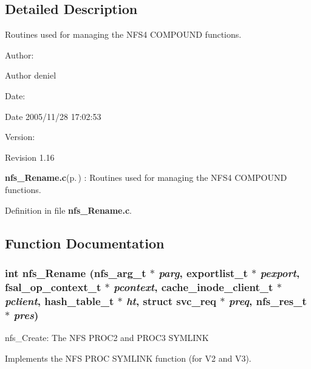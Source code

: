 \subsection{Detailed Description}
Routines used for managing the NFS4 COMPOUND functions. 

\begin{Desc}
\item[Author:]\begin{Desc}
\item[Author]deniel \end{Desc}
\end{Desc}
\begin{Desc}
\item[Date:]\begin{Desc}
\item[Date]2005/11/28 17:02:53 \end{Desc}
\end{Desc}
\begin{Desc}
\item[Version:]\begin{Desc}
\item[Revision]1.16 \end{Desc}
\end{Desc}
{\bf nfs\_\-Rename.c}{\rm (p.\,\pageref{nfs__Rename_8c})} : Routines used for managing the NFS4 COMPOUND functions.

Definition in file {\bf nfs\_\-Rename.c}.

\subsection{Function Documentation}
\subsubsection{\setlength{\rightskip}{0pt plus 5cm}int nfs\_\-Rename (nfs\_\-arg\_\-t $\ast$ {\em parg}, exportlist\_\-t $\ast$ {\em pexport}, fsal\_\-op\_\-context\_\-t $\ast$ {\em pcontext}, cache\_\-inode\_\-client\_\-t $\ast$ {\em pclient}, hash\_\-table\_\-t $\ast$ {\em ht}, struct svc\_\-req $\ast$ {\em preq}, nfs\_\-res\_\-t $\ast$ {\em pres})}\label{nfs__Rename_8c_a0}


nfs\_\-Create: The NFS PROC2 and PROC3 SYMLINK

Implements the NFS PROC SYMLINK function (for V2 and V3).

